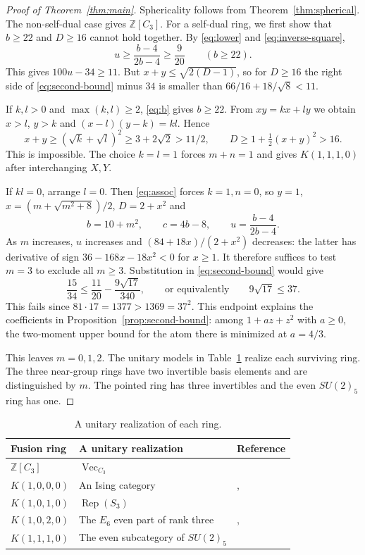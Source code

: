 \documentclass[11pt,a4paper]{article}
\theoremstyle{definition}
\theoremstyle{remark}
\newcommand{\Z}{\mathbb Z}
\newcommand{\Rep}{\operatorname{Rep}}
\newcommand{\Vect}{\operatorname{Vec}}
\numberwithin{equation}{section}
\begin{document}
\begin{proof}[Proof of Theorem~\ref{thm:main}]
Sphericality follows from Theorem~\ref{thm:spherical}. The non-self-dual
case gives $\Z[C_3]$. For a self-dual ring, we first show that
$b\geq22$ and $D\geq16$ cannot hold together. By \eqref{eq:lower}
and \eqref{eq:inverse-square},
\[
 u\geq\frac{b-4}{2b-4}\geq\frac9{20}\qquad(b\geq22).
\]
This gives $100u-34\geq11$. But $x+y\leq\sqrt{2(D-1)}$,
so for $D\geq16$ the right side of \eqref{eq:second-bound} minus
$34$ is smaller than $66/16+18/\sqrt8<11$.

If $k,l>0$ and $\max(k,l)\geq2$, \eqref{eq:b} gives $b\geq22$.
From $xy=kx+ly$ we obtain $x>l$, $y>k$ and $(x-l)(y-k)=kl$. Hence
\[
 x+y\geq(\sqrt k+\sqrt l)^2\geq3+2\sqrt2>11/2,
 \qquad D\geq1+\tfrac12(x+y)^2>16.
\]
This is impossible. The choice $k=l=1$ forces $m+n=1$ and gives
$K(1,1,1,0)$ after interchanging $X,Y$.

If $kl=0$, arrange $l=0$. Then \eqref{eq:assoc} forces $k=1,n=0$,
so $y=1$, $x=(m+\sqrt{m^2+8})/2$, $D=2+x^2$ and
\[
 b=10+m^2,\qquad c=4b-8,\qquad u=\frac{b-4}{2b-4}.
\]
As $m$ increases, $u$ increases and $(84+18x)/(2+x^2)$ decreases:
the latter has derivative of sign $36-168x-18x^2<0$ for $x\geq1$.
It therefore suffices to test $m=3$ to exclude all $m\geq3$.
Substitution in \eqref{eq:second-bound} would give
\[
 \frac{15}{34}\leq \frac{11}{20}-\frac{9\sqrt{17}}{340},
 \qquad\text{or equivalently}\qquad 9\sqrt{17}\leq37.
\]
This fails since $81\cdot17=1377>1369=37^2$. This endpoint explains
the coefficients in Proposition~\ref{prop:second-bound}: among
$1+az+z^2$ with $a\geq0$, the two-moment upper bound for the atom
there is minimized at $a=4/3$.

This leaves $m=0,1,2$. The unitary models in Table~\ref{tab:models}
realize each surviving ring. The three near-group rings have two
invertible basis elements and are distinguished by $m$. The pointed
ring has three invertibles and the even $SU(2)_5$ ring has one.
\end{proof}

\begin{table}[htbp]
\centering
\small
\begin{tabular}{@{}lll@{}}
\toprule
Fusion ring & A unitary realization & Reference\\
\midrule
$\Z[C_3]$ & $\Vect_{C_3}$ & \cite[Theorem~1.1(i)]{Ostrik}\\
$K(1,0,0,0)$ & An Ising category & \cite{TY}, \cite[Thm.~1.1(iii)]{Ostrik}\\
$K(1,0,1,0)$ & $\Rep(S_3)$ & \cite[Theorem~1.1(iv)]{Ostrik}\\
$K(1,0,2,0)$ & The $E_6$ even part of rank three & \cite{BN,HH}, \cite[Sec.~1]{EIP}\\
$K(1,1,1,0)$ & The even subcategory of $SU(2)_5$ & \cite[Sec.~4]{OstrikRibbon}\\
\bottomrule
\end{tabular}
\caption{A unitary realization of each ring.}
\label{tab:models}
\end{table}
\end{document}
